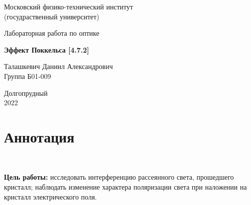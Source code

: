 \documentclass[a4paper, 12pt]{article}%
\begin{document}


\begin{titlepage}

	\newpage
	\begin{center}
		\normalsize Московский физико-технический институт \\(госудраственный 			университет)
	\end{center}

	\vspace{6em}

	\begin{center}
		\Large Лабораторная работа по оптике\\
	\end{center}

	\vspace{1em}

	\begin{center}
		\large \textbf{Эффект Поккельса [4.7.2]}
	\end{center}

	\vspace{2em}

	\begin{center}
		\large Талашкевич Даниил Александрович\\
		Группа Б01-009
	\end{center}

	\vspace{\fill}

	\begin{center}
	Долгопрудный \\2022
	\end{center}
	
\end{titlepage}



	\thispagestyle{empty}
	\newpage
	\tableofcontents
	\newpage
	\setcounter{page}{1}



\section{Аннотация}

$\text{ }$

\textbf{Цель работы:} исследовать интерференцию рассеянного света, прошедшего кристалл; наблюдать изменение характера поляризации света при наложении на кристалл электрического поля.
\end{document}
